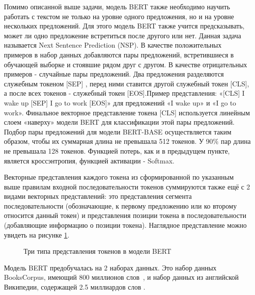 Помимо описанной выше задачи, модель BERT также необходимо научить работать с текстом не только на уровне одного предложения, но и на уровне нескольких предложений. Для этого модель BERT также учится предсказывать, может ли одно предложение встретиться после другого или нет. Данная задача называется Next Sentence Prediction (NSP). В качестве положительных примеров в набор данных добавляются пары предложений, встретившиеся в обучающей выборке и стоявшие рядом друг с другом. В качестве отрицательных примеров - случайные пары предложений. Два предложения разделяются служебным токеном [SEP] , перед ними ставится другой служебный токен [CLS], а после всех токенов - служебный токен [EOS].Пример представления: «[CLS] I wake up [SEP] I go to work [EOS]» для предложений «I wake up» и «I go to work». Финальное векторное представление токена [CLS] используется линейным слоем «наверху» модели BERT для классификации этой пары предложений. Подбор пары предложений для модели BERT-BASE осуществляется таким образом, чтобы их суммарная длина не превышала 512 токенов. У 90\% пар длина не превышала 128 токенов. Функцией потерь, как и в предыдущем пункте, является кроссэнтропия, функцией активации - Softmax.

Векторные представления каждого токена из сформированной по указанным выше правилам входной последовательности токенов суммируются также ещё с 2 видами векторных представлений: это представления сегмента последовательности (обозначающие, к первому предложению или ко второму относится данный токен) и представления позиции токена в последовательности (добавляющие информацию о позиции токена). Наглядное представление можно увидеть на рисунке \ref{fig:Transformer5-BERTTokenTypes}. 

\begin{figure}[ht]
 \caption{Три типа представления токенов в модели BERT}\label{fig:Transformer5-BERTTokenTypes}
\end{figure}
Модель BERT предобучалась на 2 наборах данных. Это набор данных BooksCorpus, имеющий 800 миллионов слов~\cite{zhu_2015}, и набор данных из английской Википедии, содержащей 2.5 миллиардов слов \cite{devlin_2018}. 

